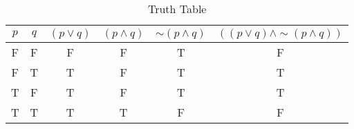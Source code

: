 \begin{table}[ht]
\caption{Truth Table}
\centering
\begin{tabular}{|c|c||c|c|c|c|}
\hline
$ p $ & $ q $ & $ (p \vee q) $ & $ (p \wedge q) $ & $  \sim (p \wedge q) $ & $ ((p \vee q) \wedge  \sim (p \wedge q)) $ \\
\hline
F & F & F & F & T & F \\
F & T & T & F & T & T \\
T & F & T & F & T & T \\
T & T & T & T & F & F \\
\hline
\end{tabular}
\label{table:tt1}
\end{table}
